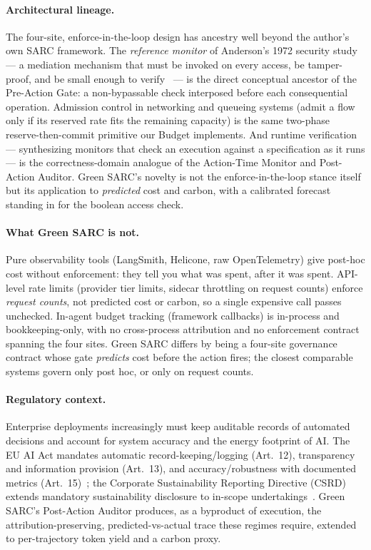 \documentclass[11pt]{article}
\theoremstyle{plain}
\theoremstyle{definition}
\theoremstyle{remark}
\begin{document}
\paragraph{Architectural lineage.} The four-site, enforce-in-the-loop design has ancestry well beyond the author's own SARC framework. The \emph{reference monitor} of Anderson's 1972 security study --- a mediation mechanism that must be invoked on every access, be tamper-proof, and be small enough to verify~\cite{anderson1972} --- is the direct conceptual ancestor of the Pre-Action Gate: a non-bypassable check interposed before each consequential operation. Admission control in networking and queueing systems (admit a flow only if its reserved rate fits the remaining capacity) is the same two-phase reserve-then-commit primitive our Budget implements. And runtime verification --- synthesizing monitors that check an execution against a specification as it runs --- is the correctness-domain analogue of the Action-Time Monitor and Post-Action Auditor. Green SARC's novelty is not the enforce-in-the-loop stance itself but its application to \emph{predicted} cost and carbon, with a calibrated forecast standing in for the boolean access check.

\paragraph{What Green SARC is not.} Pure observability tools (LangSmith, Helicone, raw OpenTelemetry) give post-hoc cost without enforcement: they tell you what was spent, after it was spent. API-level rate limits (provider tier limits, sidecar throttling on request counts) enforce \emph{request counts}, not predicted cost or carbon, so a single expensive call passes unchecked. In-agent budget tracking (framework callbacks) is in-process and bookkeeping-only, with no cross-process attribution and no enforcement contract spanning the four sites. Green SARC differs by being a four-site governance contract whose gate \emph{predicts} cost before the action fires; the closest comparable systems govern only post hoc, or only on request counts.

\paragraph{Regulatory context.} Enterprise deployments increasingly must keep auditable records of automated decisions and account for system accuracy and the energy footprint of AI. The EU AI Act mandates automatic record-keeping/logging (Art.~12), transparency and information provision (Art.~13), and accuracy/robustness with documented metrics (Art.~15)~\cite{aiact}; the Corporate Sustainability Reporting Directive (CSRD) extends mandatory sustainability disclosure to in-scope undertakings~\cite{csrd}. Green SARC's Post-Action Auditor produces, as a byproduct of execution, the attribution-preserving, predicted-vs-actual trace these regimes require, extended to per-trajectory token yield and a carbon proxy.
\end{document}
